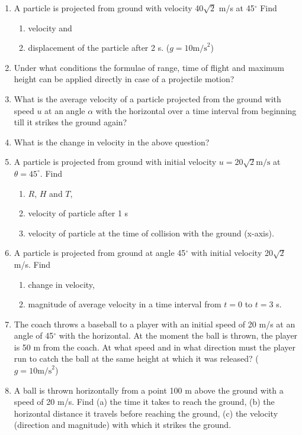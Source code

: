 \documentclass{article}
\begin{document}
\begin{enumerate}
    \item A particle is projected from ground with velocity 40\(\sqrt{2}\) m/s at 45\(^{\circ}\) Find
    \begin{enumerate}
        \item velocity and
        \item displacement of the particle after 2 s. (\( g = 10 \text{m/s}^2 \))
    \end{enumerate}
    \item Under what conditions the formulae of range, time of flight and maximum height can be applied directly in case of a projectile motion?
    \item What is the average velocity of a particle projected from the ground with speed \( u \) at an angle \( \alpha \) with the horizontal over a time interval from beginning till it strikes the ground again?
    \item What is the change in velocity in the above question?
    \item A particle is projected from ground with initial velocity \( u = 20\sqrt{2} \text{m/s} \) at \( \theta = 45^{\circ} \). Find
    \begin{enumerate}
        \item \( R \), \( H \) and \( T \),
        \item velocity of particle after 1 s
        \item velocity of particle at the time of collision with the ground (x-axis).
    \end{enumerate}
    \item A particle is projected from ground at angle 45\(^{\circ}\) with initial velocity 20\(\sqrt{2}\) m/s. Find
    \begin{enumerate}
        \item change in velocity,
        \item magnitude of average velocity in a time interval from \( t = 0 \) to \( t = 3 \) s.
    \end{enumerate}
    \item The coach throws a baseball to a player with an initial speed of 20 m/s at an angle of 45\(^{\circ}\) with the horizontal. At the moment the ball is thrown, the player is 50 m from the coach. At what speed and in what direction must the player run to catch the ball at the same height at which it was released? (\( g = 10 \text{m/s}^2 \))
    \item A ball is thrown horizontally from a point 100 m above the ground with a speed of 20 m/s. Find (a) the time it takes to reach the ground, (b) the horizontal distance it travels before reaching the ground, (c) the velocity (direction and magnitude) with which it strikes the ground.

\end{enumerate}
\end{document}
